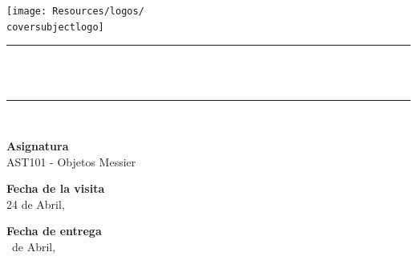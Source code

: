 \begin{titlepage}
    \newcommand{\HRule}{\rule{\linewidth}{0.5mm}}
    \center
    
    \vspace{1.5cm}
    \texttt{[image: Resources/logos/\\coversubjectlogo]}
    
    \vspace{1cm}
    \HRule \\[0.4cm]
    {\huge \bfseries \largetitlename}\\
    \HRule \\
    
    \vfill
    
    \large \textbf{Asignatura} \\
    \textsc{AST101} - Objetos Messier
    
    \vspace{1cm}
    
    \printauthors
    
    \vspace{1cm}
    
    \printprof
    
    \vfill
    
    \begin{minipage}[t]{0.45\textwidth}
        \centering
        \large \textbf{Fecha de la visita} \\ 24 de Abril, \the\year
    \end{minipage}
        \hfill
    \begin{minipage}[t]{0.45\textwidth}
        \centering
        \large \textbf{Fecha de entrega} \\ \the\day \ de Abril, \the\year
    \end{minipage}
    
\end{titlepage}